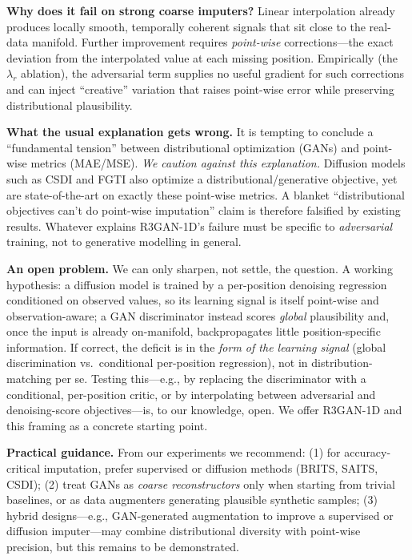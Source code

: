 \documentclass[sigconf,nonacm]{acmart}
\begin{document}
\textbf{Why does it fail on strong coarse imputers?}
Linear interpolation already produces locally smooth, temporally coherent signals that sit close to the real-data manifold.
Further improvement requires \emph{point-wise} corrections---the exact deviation from the interpolated value at each missing position.
Empirically (the $\lambda_r$ ablation), the adversarial term supplies no useful gradient for such corrections and can inject ``creative'' variation that raises point-wise error while preserving distributional plausibility.

\textbf{What the usual explanation gets wrong.}
It is tempting to conclude a ``fundamental tension'' between distributional optimization (GANs) and point-wise metrics (MAE/MSE). \emph{We caution against this explanation.}
Diffusion models such as CSDI and FGTI also optimize a distributional/generative objective, yet are state-of-the-art on exactly these point-wise metrics. A blanket ``distributional objectives can't do point-wise imputation'' claim is therefore falsified by existing results. Whatever explains R3GAN-1D's failure must be specific to \emph{adversarial} training, not to generative modelling in general.

\textbf{An open problem.}
We can only sharpen, not settle, the question. A working hypothesis: a diffusion model is trained by a per-position denoising regression conditioned on observed values, so its learning signal is itself point-wise and observation-aware; a GAN discriminator instead scores \emph{global} plausibility and, once the input is already on-manifold, backpropagates little position-specific information. If correct, the deficit is in the \emph{form of the learning signal} (global discrimination vs.\ conditional per-position regression), not in distribution-matching per se. Testing this---e.g., by replacing the discriminator with a conditional, per-position critic, or by interpolating between adversarial and denoising-score objectives---is, to our knowledge, open. We offer R3GAN-1D and this framing as a concrete starting point.

\textbf{Practical guidance.}
From our experiments we recommend:
(1) for accuracy-critical imputation, prefer supervised or diffusion methods (BRITS, SAITS, CSDI);
(2) treat GANs as \emph{coarse reconstructors} only when starting from trivial baselines, or as data augmenters generating plausible synthetic samples;
(3) hybrid designs---e.g., GAN-generated augmentation to improve a supervised or diffusion imputer---may combine distributional diversity with point-wise precision, but this remains to be demonstrated.
\end{document}
